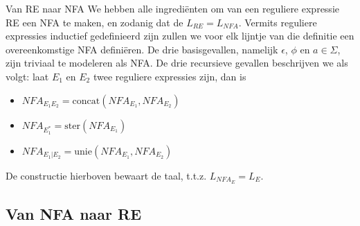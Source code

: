 \begin{theo}{Van RE naar NFA}
    We hebben alle ingrediënten om van een reguliere expressie RE een NFA te maken, en zodanig dat de $L_{RE} = L_{NFA}$.
    Vermits reguliere expressies inductief gedefinieerd zijn zullen we voor elk lijntje van die definitie een overeenkomstige NFA definiëren.
    De drie basisgevallen, namelijk $\epsilon$, $\phi$ en $a \in \Sigma$, zijn triviaal te modeleren als NFA.
    De drie recursieve gevallen beschrijven we als volgt: laat $E_{1}$ en $E_{2}$ twee reguliere expressies zijn, dan is
    \begin{itemize}
        \item $NFA_{E_{1}E_{2}} = \text{concat}(NFA_{E_{1}},NFA_{E_{2}})$
        \item $NFA_{E_{1}^{*}} = \text{ster}(NFA_{E_{1}})$
        \item $NFA_{E_{1}|E_{2}} = \text{unie}(NFA_{E_{1}},NFA_{E_{2}})$
    \end{itemize}
    \noindent De constructie hierboven bewaart de taal, t.t.z. $L_{NFA_{E}} = L_{E}$.
\end{theo}

\subsection{Van NFA naar RE}

\vspace{0.5cm}

